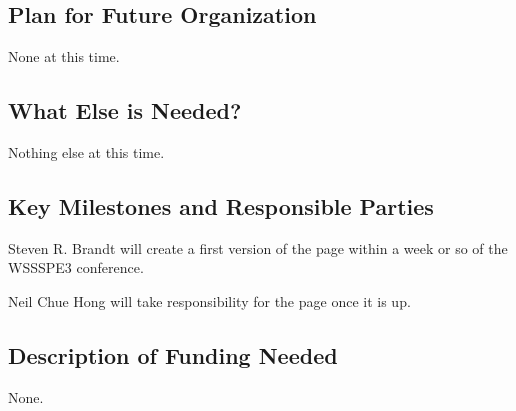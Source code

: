 \subsection{Plan for Future Organization}

None at this time.

\subsection{What Else is Needed?}

Nothing else at this time.

\subsection{Key Milestones and Responsible Parties}

Steven R. Brandt will create a first version of the page within a week or so of the WSSSPE3 conference.

Neil Chue Hong will take responsibility for the page once it is up.

\subsection{Description of Funding Needed}

None.
